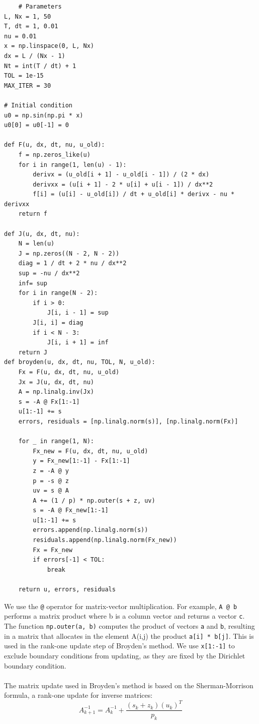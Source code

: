 \documentclass[12pt]{article}
\begin{document}
\begin{verbatim}
    # Parameters
L, Nx = 1, 50
T, dt = 1, 0.01
nu = 0.01
x = np.linspace(0, L, Nx)
dx = L / (Nx - 1)
Nt = int(T / dt) + 1
TOL = 1e-15
MAX_ITER = 30

# Initial condition
u0 = np.sin(np.pi * x)
u0[0] = u0[-1] = 0

def F(u, dx, dt, nu, u_old):
    f = np.zeros_like(u)
    for i in range(1, len(u) - 1):
        derivx = (u_old[i + 1] - u_old[i - 1]) / (2 * dx)
        derivxx = (u[i + 1] - 2 * u[i] + u[i - 1]) / dx**2
        f[i] = (u[i] - u_old[i]) / dt + u_old[i] * derivx - nu * derivxx
    return f

def J(u, dx, dt, nu):
    N = len(u)
    J = np.zeros((N - 2, N - 2))
    diag = 1 / dt + 2 * nu / dx**2
    sup = -nu / dx**2
    inf= sup
    for i in range(N - 2):
        if i > 0:
            J[i, i - 1] = sup
        J[i, i] = diag
        if i < N - 3:
            J[i, i + 1] = inf
    return J
def broyden(u, dx, dt, nu, TOL, N, u_old):
    Fx = F(u, dx, dt, nu, u_old)
    Jx = J(u, dx, dt, nu)
    A = np.linalg.inv(Jx)
    s = -A @ Fx[1:-1]
    u[1:-1] += s
    errors, residuals = [np.linalg.norm(s)], [np.linalg.norm(Fx)]
    
    for _ in range(1, N):
        Fx_new = F(u, dx, dt, nu, u_old)
        y = Fx_new[1:-1] - Fx[1:-1]
        z = -A @ y
        p = -s @ z
        uv = s @ A
        A += (1 / p) * np.outer(s + z, uv)
        s = -A @ Fx_new[1:-1]
        u[1:-1] += s
        errors.append(np.linalg.norm(s))
        residuals.append(np.linalg.norm(Fx_new))
        Fx = Fx_new
        if errors[-1] < TOL:
            break

    return u, errors, residuals
\end{verbatim}
We use the \texttt{@} operator for matrix-vector multiplication. For example, \texttt{A @ b} performs a matrix product where b is a column vector and returns a vector \texttt{c}. The function \texttt{np.outer(a, b)} computes the product of vectors \texttt{a} and \texttt{b}, resulting in a matrix that allocates in the element A(i,j) the product \texttt{a[i] * b[j]}. This is used in the rank-one update step of Broyden's method. We use \texttt{x[1:-1]} to exclude boundary conditions from updating, as they are fixed by the Dirichlet boundary condition.
\\\\
The matrix update used in Broyden’s method is based on the Sherman-Morrison formula, a rank-one update for inverse matrices:
\[
A_{k+1}^{-1} = A_k^{-1} + \frac{(s_k + z_k)(u_k)^T}{p_k}
\]
\end{document}
